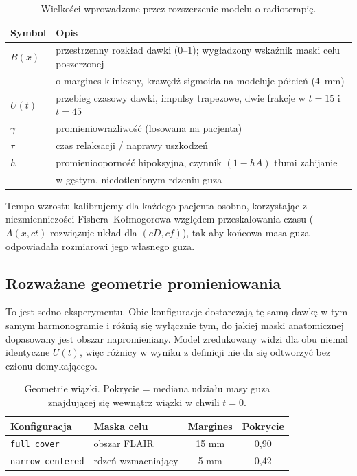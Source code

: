 \documentclass[11pt,a4paper]{article}
\begin{document}
\begin{table}[H]
\centering\small
\begin{tabular}{@{}ll@{}}
\toprule
\textbf{Symbol} & \textbf{Opis} \\
\midrule
$B(x)$      & przestrzenny rozkład dawki (0--1); wygładzony wskaźnik maski celu poszerzonej\\
            & o margines kliniczny, krawędź sigmoidalna modeluje półcień (4~mm)\\
$U(t)$      & przebieg czasowy dawki, impulsy trapezowe, dwie frakcje w $t=15$ i $t=45$\\
$\gamma$    & promieniowrażliwość (losowana na pacjenta)\\
$\tau$      & czas relaksacji / naprawy uszkodzeń\\
$h$         & promieniooporność hipoksyjna, czynnik $(1-hA)$ tłumi zabijanie\\
            & w gęstym, niedotlenionym rdzeniu guza\\
\bottomrule
\end{tabular}
\caption{Wielkości wprowadzone przez rozszerzenie modelu o radioterapię.}
\label{table:radiotherapy}
\end{table}

Tempo wzrostu kalibrujemy dla każdego pacjenta osobno, korzystając z niezmienniczości
Fishera--Kołmogorowa względem przeskalowania czasu ($A(x,ct)$ rozwiązuje układ dla
$(cD, cf)$), tak aby końcowa masa guza odpowiadała rozmiarowi jego własnego guza.

\subsection{Rozważane geometrie promieniowania}

To jest sedno eksperymentu. Obie konfiguracje dostarczają tę samą dawkę w tym samym
harmonogramie i różnią się wyłącznie tym, do jakiej maski anatomicznej dopasowany
jest obszar napromieniany. Model zredukowany widzi dla obu
niemal identyczne $U(t)$, więc różnicy w wyniku z definicji nie da się
odtworzyć bez członu domykającego.

\begin{table}[H]
\centering\small
\begin{tabular}{@{}llcc@{}}
\toprule
\textbf{Konfiguracja} & \textbf{Maska celu} & \textbf{Margines} & \textbf{Pokrycie} \\
\midrule
\texttt{full\_cover}      & obszar FLAIR       & 15 mm & 0,90 \\
\texttt{narrow\_centered} & rdzeń wzmacniający & 5 mm  & 0,42 \\
\bottomrule
\end{tabular}
\caption{Geometrie wiązki. Pokrycie = mediana udziału masy guza znajdującej się
wewnątrz wiązki w chwili $t=0$.}
\end{table}
\end{document}
